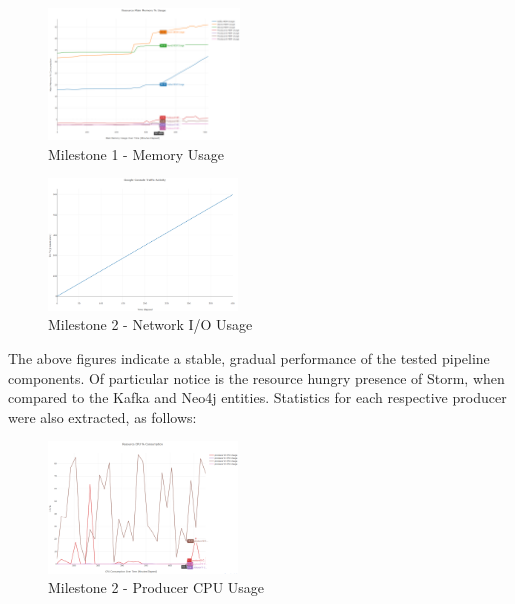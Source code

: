 \documentclass[10pt,conference]{IEEEtran}
\begin{document}
\clearpage

\begin{figure}[h]
    \centering
    \includegraphics[height=3.5cm,keepaspectratio]{Milestone1MemoryUsage.png}
    \captionsetup                                 {justification=centering}
    \caption                                      {Milestone 1 - Memory Usage}
    \label                                        {fig:Milestone1MemoryUsage}
\end{figure}

\begin{figure}[h]
    \centering
    \includegraphics[height=3.5cm,keepaspectratio]{Milestone2NetUsage.png}
    \captionsetup                                 {justification=centering}
    \caption                                      {Milestone 2 - Network I/O Usage}
    \label                                        {fig:Milestone2NetUsage}
\end{figure}

The above figures indicate a stable, gradual performance of the tested pipeline components. Of particular notice is the resource hungry presence of Storm, when compared to the Kafka and Neo4j entities. Statistics for each respective producer were also extracted, as follows:

\begin{figure}[h]
    \centering
    \includegraphics[height=3.5cm,keepaspectratio]{Milestone2ProducerCPU.png}
    \captionsetup                                 {justification=centering}
    \caption                                      {Milestone 2 - Producer CPU Usage}
    \label                                        {fig:Milestone2ProducerCPU}
\end{figure}
\end{document}
